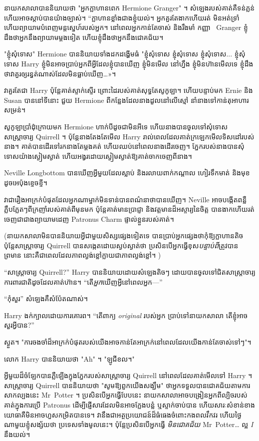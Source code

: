នាយកសាលាបាននិយាយថា "អ្នកក្លាហានពេក Hermione Granger" ។ សំឡេងរបស់គាត់គឺទន់ភ្លន់ ហើយអាចស្តាប់បានយ៉ាងច្បាស់។ “ក្លាហាន​ខ្លាំង​ជាង​ខ្ញុំ​យល់។ អ្នក​គួរ​តែ​ងាក​ហើយ​រត់ មិន​អត់​ទ្រាំ ហើយ​ព្យាយាម​បំពេញ​មន្ត​ស្នេហ៍​របស់​អ្នក។ នៅពេលអ្នកកាន់តែចាស់ និងរឹងមាំ កញ្ញា ~Granger ខ្ញុំដឹងថាអ្នកនឹងព្យាយាមម្តងទៀត ហើយខ្ញុំដឹងថាអ្នកនឹងជោគជ័យ។

"ខ្ញុំសុំទោស" Hermione បាននិយាយទាំងដកដង្ហើមធំ "ខ្ញុំសុំទោស ខ្ញុំសុំទោស ខ្ញុំសុំទោស... ខ្ញុំសុំទោស Harry ខ្ញុំមិនអាចប្រាប់អ្នកពីអ្វីដែលខ្ញុំបានឃើញ ខ្ញុំមិនមើល នៅ​ហ្នឹង ខ្ញុំ​មិន​ហ៊ាន​មើល​ទេ ខ្ញុំ​ដឹង​ថា​វា​គួរ​ឲ្យ​រន្ធត់​ណាស់​ដែល​មិន​ធ្លាប់​ឃើញ…»។

វាគួរតែជា Harry ប៉ុន្តែគាត់ស្ទាក់ស្ទើរ ព្រោះដៃរបស់គាត់សុទ្ធតែសូកូឡា។ ហើយបន្ទាប់មក Ernie និង Susan បាននៅទីនោះ ជួយ Hermione ពីកន្លែងដែលនាងដួលនៅលើស្មៅ នាំនាងទៅកាន់តុអាហារសម្រន់។

សូកូឡាប្រាំដុំក្រោយមក Hermione ហាក់បីដូចជាមិនអីទេ ហើយនាងបានចូលទៅសុំទោសសាស្រ្តាចារ្យ Quirrell ។ ប៉ុន្តែនាងតែងតែមើល Harry រាល់ពេលដែលគាត់ក្រឡេកមើលទិសដៅរបស់នាង។ គាត់បានដើរទៅរកនាងតែម្តងគត់ ហើយឈប់នៅពេលនាងដើរចេញ។ ភ្នែក​របស់​នាង​បាន​សុំទោស​យ៉ាង​ស្ងៀម​ស្ងាត់ ហើយ​អង្វរ​ដោយ​ស្ងៀម​ស្ងាត់​ឱ្យ​គាត់​ចាក​ចេញ​ពី​នាង។

\later

Neville Longbottom បានឃើញអ្វីមួយដែលស្លាប់ និងរលាយពាក់កណ្តាល ហៀរទឹកមាត់ និងមុខដូចអេប៉ុងខ្ទេចខ្ទី។

វា​ជា​រឿង​អាក្រក់​បំផុត​ដែល​អ្នក​ណា​ម្នាក់​មិន​ទាន់​បាន​ពណ៌នា​ថា​បាន​ឃើញ។ Neville អាចបង្កើតពន្លឺភ្លឹបភ្លែតៗពីក្រញាំរបស់គាត់ពីមុនមក ប៉ុន្តែគាត់មានប្រាជ្ញា និងវត្តមានដ៏អស្ចារ្យនៃចិត្ត បានងាកហើយរត់ចេញជាជាងព្យាយាមដេញ Patronus Charm ផ្ទាល់ខ្លួនរបស់គាត់។

(នាយកសាលាមិនបាននិយាយអ្វីជាមួយសិស្សផ្សេងទៀតទេ បានប្រាប់អ្នកផ្សេងថាកុំឱ្យក្លាហានតិច ប៉ុន្តែសាស្ត្រាចារ្យ Quirrell បានសង្កេតដោយស្ងប់ស្ងាត់ថា ប្រសិនបើអ្នកធ្វើខុស\emph{បន្ទាប់ពី}ត្រូវបានព្រមាន នោះគឺជាពេលដែលភាពល្ងង់ខ្លៅក្លាយជាភាពល្ងង់ខ្លៅ។ )

“សាស្រ្តាចារ្យ Quirrell?” Harry បាននិយាយដោយសំឡេងតិចៗ ដោយបានចូលទៅជិតសាស្រ្តាចារ្យការពារជាតិដូចដែលគាត់ហ៊ាន។ “តើ\emph{អ្នក}ឃើញអ្វីនៅពេលអ្នក—”

“កុំសួរ” សំឡេងគឺសំប៉ែតណាស់។

Harry ងក់ក្បាលដោយការគោរព។ “តើពាក្យ \emph{original} របស់អ្នក ប្រាប់ទៅនាយកសាលា តើខ្ញុំអាចសួរអ្វីបាន?”

ស្ងួត។ "ការចងចាំដ៏អាក្រក់បំផុតរបស់យើងអាចកាន់តែអាក្រក់នៅពេលដែលយើងកាន់តែចាស់ទៅៗ"។

លោក Harry បាននិយាយថា "Ah" ។ "ឡូជីខល។"

អ្វី​មួយ​ដ៏​ចំឡែក​បាន​ភ្លឺ​ឡើង​ក្នុង​ភ្នែក​របស់​សាស្ត្រាចារ្យ Quirrell នៅ​ពេល​ដែល​គាត់​មើល​ទៅ Harry ។ សាស្រ្តាចារ្យ Quirrell បាននិយាយថា "សូមឱ្យពួកយើងសង្ឃឹម" ថាអ្នកទទួលបានជោគជ័យតាមការសាកល្បងនេះ Mr~Potter ។ ប្រសិនបើអ្នកធ្វើបែបនេះ នាយកសាលាអាចបង្រៀនអ្នកពីល្បិចរបស់គាត់ក្នុងការប្រើ Patronus ដើម្បីផ្ញើសារដែលមិនអាចក្លែងបន្លំ ឬស្ទាក់ចាប់បាន ហើយសារៈសំខាន់ខាងយោធាគឺមិនអាចហួសកម្រិតបានទេ។ វា​នឹង​ជា​អត្ថប្រយោជន៍​ដ៏​ធំធេង​ចំពោះ​កងពល​វឹកវរ ហើយ​ថ្ងៃ​ណាមួយ​ខ្ញុំ​សង្ស័យថា ប្រទេស​ទាំងមូល​នេះ។ ប៉ុន្តែប្រសិនបើអ្នកធ្វើ \emph{មិនជោគជ័យ} Mr~Potter… ល្អ \emph{I} នឹងយល់។


